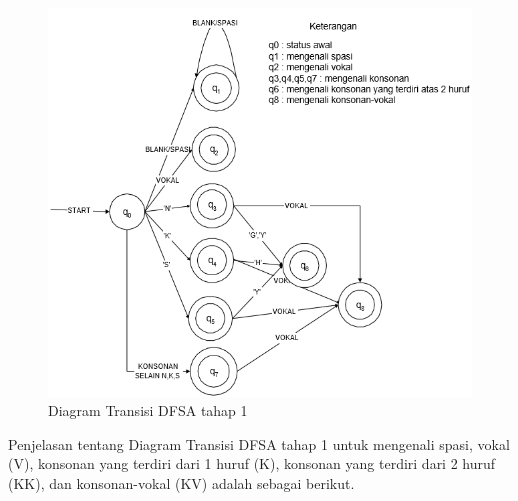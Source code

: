 \begin{figure}[H]
	\centering
	\includegraphics[scale=0.8]{Gambar/DFSA-1}
	\caption{Diagram Transisi DFSA tahap 1\cite{Thomas:2000}} 
	\label{fig:1-DFSA-1}
\end{figure}

Penjelasan tentang Diagram Transisi DFSA tahap 1 untuk mengenali spasi, vokal (V), konsonan yang terdiri dari 1 huruf (K), konsonan yang terdiri dari 2 huruf (KK), dan konsonan-vokal (KV) adalah sebagai berikut.

